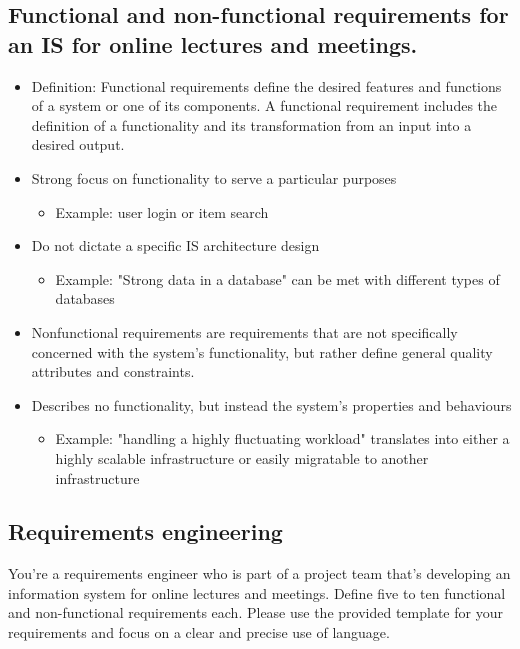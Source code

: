\documentclass{article}
\begin{document}
\subsection{Functional and non-functional requirements for an IS for online lectures and meetings.}
\begin{itemize}
    \item Definition: Functional requirements define the desired features and functions of a system or one of its components. A functional requirement includes the definition of a functionality and its transformation from an input into a desired output.
    \item Strong focus on functionality to serve a particular purposes
          \begin{itemize}
              \item Example: user login or item search
          \end{itemize}
    \item Do not dictate a specific IS architecture design
          \begin{itemize}
              \item Example: "Strong data in a database" can be met with different types of databases
          \end{itemize}
    \item Nonfunctional requirements are requirements that are not specifically concerned with the system's functionality, but rather define general quality attributes and constraints.
    \item Describes no functionality, but instead the system's properties and behaviours
          \begin{itemize}
              \item Example: "handling a highly fluctuating workload" translates into either a highly scalable infrastructure or easily migratable to another infrastructure
          \end{itemize}
\end{itemize}

\subsection{Requirements engineering}
You're a requirements engineer who is part of a project team that's developing an information system for online lectures and meetings. Define five to ten functional and non-functional requirements each. Please use the provided template for your requirements and focus on a clear and precise use of language.
\end{document}
